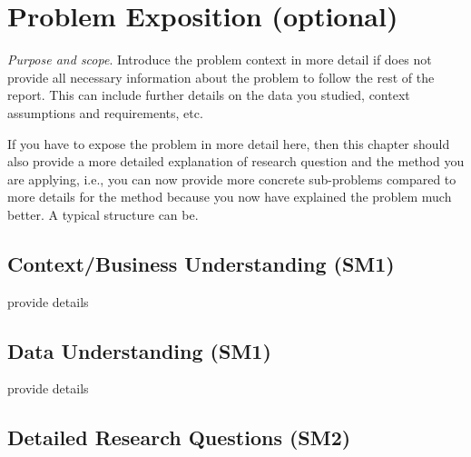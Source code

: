 \documentclass[../main-english]{subfiles}
\begin{document}
\chapter{Problem Exposition (optional)}\label{sec:problem-exposition}

\emph{Purpose and scope}.
Introduce the problem context in more detail if  does not provide all necessary information about the problem to follow the rest of the report.
This can include further details on the data you studied, context assumptions and requirements, etc.

If you have to expose the problem in more detail here, then this chapter should also provide a more detailed explanation of research question and the method you are applying, i.e., you can now provide more concrete sub-problems compared to  more details for the method  because you now have explained the problem much better.
A typical structure can be.

\section{Context/Business Understanding (SM1)}\label{sec:problem-exposition:context-understanding}

provide details

\section{Data Understanding (SM1)}\label{sec:problem-exposition:data-understanding}

provide details

\section{Detailed Research Questions (SM2)}\label{sec:problem-exposition:research-problems}
\end{document}
